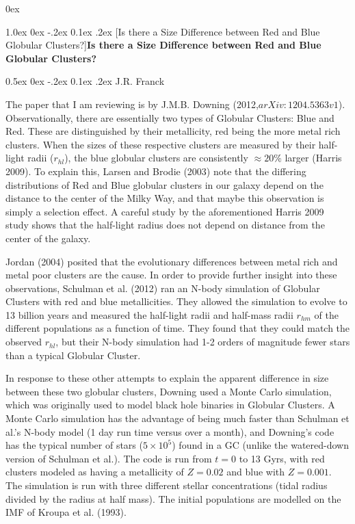 \documentclass[12pt]{article}
\makeatletter
\newcommand{\ssection}[1]{%
     \section[#1{\rm \dotfill}]{\bf #1}}
\renewcommand\section{\@startsection {section}{1}{\z@}%
                                   {1.0ex \@plus 0ex \@minus -.2ex}%
                                   {0.1ex \@plus.2ex}%
                                   {\normalfont\large\bfseries}}
\renewcommand\subsection{\@startsection {subsection}{1}{\z@}%
                                   {0.5ex \@plus 0ex \@minus -.2ex}%
                                   {0.1ex \@plus.2ex}%
                                   {\normalfont\bfseries}}
\makeatother
\begin{document}
\parindent 0ex

\ssection{Is there a Size Difference between Red and Blue Globular Clusters?}

\subsection{J.R. Franck}\vspace{-0.5em}

The paper that I am reviewing is by J.M.B. Downing (2012,$arXiv:1204.5363v1$). Observationally, there are essentially two types of Globular Clusters: Blue and Red. These are distinguished by their metallicity, red being the more metal rich clusters. When the sizes of these respective clusters are measured by their half-light radii ($r_{hl}$), the blue globular clusters are consistently $\approx 20 \% $ larger (Harris 2009). To explain this, Larsen and Brodie (2003) note that the differing distributions of Red and Blue globular clusters in our galaxy depend on the distance to the center of the Milky Way, and that maybe this observation is simply a selection effect.  A careful study by the aforementioned Harris 2009 study shows that the half-light radius does not depend on distance from the center of the galaxy.

Jordan (2004) posited that the evolutionary differences between metal rich and metal poor clusters are the cause. In order to provide further insight into these observations, Schulman et al. (2012) ran an N-body simulation of Globular Clusters with red and blue metallicities. They allowed the simulation to evolve to 13 billion years and measured the  half-light radii and  half-mass radii $r_{hm}$ of the different populations as a function of time. They found that they could match the observed $r_{hl}$, but their N-body simulation had 1-2 orders of magnitude fewer stars than a typical Globular Cluster.

In response to these other attempts to explain the apparent difference in size between these two globular clusters, Downing used a Monte Carlo simulation, which was originally used to model black hole binaries in Globular Clusters. A Monte Carlo simulation has the advantage of being much faster than Schulman et al.'s N-body model (1 day run time versus over a month), and Downing's code has the typical number of stars ($5 \times 10^5$) found in a GC (unlike the watered-down version of Schulman et al.). The code is run from $t=0$ to 13 Gyrs, with red clusters modeled as having a metallicity of $Z=0.02$ and blue with $Z=0.001$. The simulation is run with three different stellar concentrations (tidal radius divided by the radius at half mass). The initial populations are modelled on the IMF of Kroupa et al. (1993).
\end{document}
